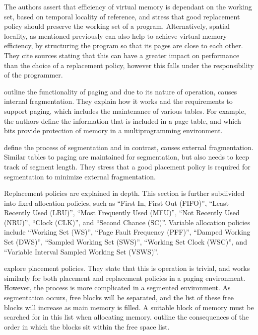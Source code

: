 The authors assert that efficiency of virtual memory is dependant on the working set, based on temporal locality of reference, and stress that good replacement policy should preserve the working set of a program. Alternatively, spatial locality, as mentioned previously can also help to achieve virtual memory efficiency, by structuring the program so that its pages are close to each other. They cite sources stating that this can have a greater impact on performance than the choice of a replacement policy, however this falls under the responsibility of the programmer.

\citet{VanWezenbeek1993} outline the functionality of paging and due to its nature of operation, causes internal fragmentation. They explain how it works and the requirements to support paging, which includes the maintenance of various tables. For example, the authors define the information that is included in a page table, and which bits provide protection of memory in a multiprogramming environment.

\citet{VanWezenbeek1993} define the process of segmentation and in contrast, causes external fragmentation. Similar tables to paging are maintained for segmentation, but also needs to keep track of segment length. They stress that a good placement policy is required for segmentation to minimize external fragmentation.

Replacement policies are explained in depth. This section is further subdivided into fixed allocation policies, such as ``First In, First Out (FIFO)'', ``Least Recently Used (LRU)'', ``Most Frequently Used (MFU)'', ``Not Recently Used (NRU)'', ``Clock (CLK)'', and ``Second Chance (SC)''. Variable allocation policies include ``Working Set (WS)'', ``Page Fault Frequency (PFF)'', ``Damped Working Set (DWS)'', ``Sampled Working Set (SWS)'', ``Working Set Clock (WSC)'', and ``Variable Interval Sampled Working Set (VSWS)''.

\citet{VanWezenbeek1993} explore placement policies. They state that this is operation is trivial, and works similarly for both placement and replacement policies in a paging environment. However, the process is more complicated in a segmented environment. As segmentation occurs, free blocks will be separated, and the list of these free blocks will increase as main memory is filled. A suitable block of memory must be searched for in this list when allocating memory. \citet{VanWezenbeek1993} outline the consequences of the order in which the blocks sit within the free space list.